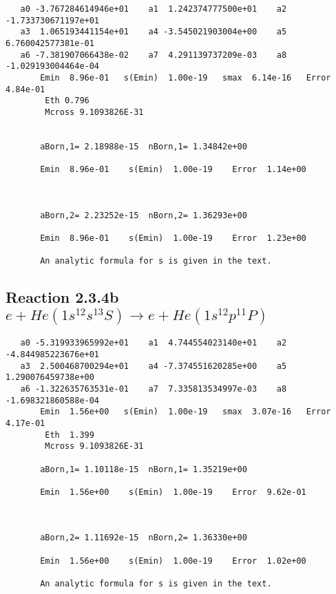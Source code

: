 \documentclass[12pt,dvipdfm]{article}
\begin{document}
\begin{small}\begin{verbatim}
   a0 -3.767284614946e+01    a1  1.242374777500e+01    a2 -1.733730671197e+01
   a3  1.065193441154e+01    a4 -3.545021903004e+00    a5  6.760042577381e-01
   a6 -7.381907066438e-02    a7  4.291139737209e-03    a8 -1.029193004464e-04
       Emin  8.96e-01   s(Emin)  1.00e-19   smax  6.14e-16   Error  4.84e-01
        Eth 0.796
        Mcross 9.1093826E-31


       aBorn,1= 2.18988e-15  nBorn,1= 1.34842e+00

       Emin  8.96e-01    s(Emin)  1.00e-19    Error  1.14e+00



       aBorn,2= 2.23252e-15  nBorn,2= 1.36293e+00

       Emin  8.96e-01    s(Emin)  1.00e-19    Error  1.23e+00

       An analytic formula for s is given in the text.
\end{verbatim}\end{small}







\newpage
\subsection{
Reaction 2.3.4b $e + He(1s^12s^13S) \rightarrow e + He(1s^12p^11P)$}

















\begin{small}\begin{verbatim}
   a0 -5.319933965992e+01    a1  4.744554023140e+01    a2 -4.844985223676e+01
   a3  2.500468700294e+01    a4 -7.374551620285e+00    a5  1.290076459738e+00
   a6 -1.322635763531e-01    a7  7.335813534997e-03    a8 -1.698321860588e-04
       Emin  1.56e+00   s(Emin)  1.00e-19   smax  3.07e-16   Error  4.17e-01
        Eth  1.399
        Mcross 9.1093826E-31

       aBorn,1= 1.10118e-15  nBorn,1= 1.35219e+00

       Emin  1.56e+00    s(Emin)  1.00e-19    Error  9.62e-01



       aBorn,2= 1.11692e-15  nBorn,2= 1.36330e+00

       Emin  1.56e+00    s(Emin)  1.00e-19    Error  1.02e+00

       An analytic formula for s is given in the text.
\end{verbatim}\end{small}
\end{document}
